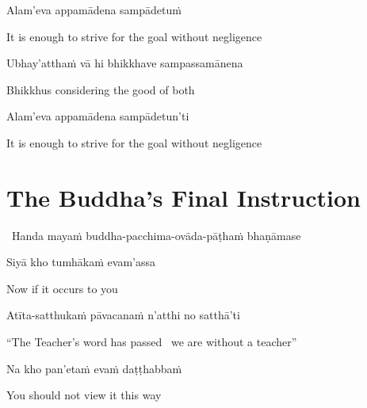 Alam'eva appamādena sampādetuṁ

\begin{english}
  It is enough to strive for the goal without negligence
\end{english}

Ubhay'atthaṁ vā hi bhikkhave sampassamānena

\begin{english}
  Bhikkhus considering the good of both
\end{english}

Alam'eva appamādena sampādetun'ti\ifdigitalversion\makeatletter\hyperlink{endnote93-appendix}\makeatother\fi

\begin{english}
  It is enough to strive for the goal without negligence
\end{english}

\suttaRef{[SN 12.22]}

\ifdigitalversion{}\fi



\section{The Buddha's Final Instruction}
\label{buddhas-final-instruction}

\begin{leader}
  \anglebracketleft\ \hspace{-0.5mm}Handa mayaṁ buddha-pacchima-ovāda-pāṭhaṁ bhaṇāmase \hspace{-0.5mm}\anglebracketright\
\end{leader}

Siyā kho tumhākaṁ evam'assa

\begin{english}
  Now if it occurs to you
\end{english}

Atīta-satthukaṁ pāvacanaṁ n'atthi no satthā'ti

\begin{english}
  ``The Teacher's word has passed \breathmark\ we are without a teacher''
\end{english}

Na kho pan'etaṁ evaṁ daṭṭhabbaṁ

\begin{english}
  You should not view it this way
\end{english}


